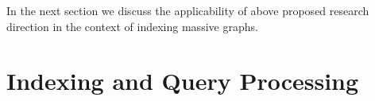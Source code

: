 %
% 
%
%
%


%
%
%
%
%
%


In the next section we discuss the applicability of above proposed research direction in the context of indexing massive graphs.
\section{Indexing and Query Processing}

